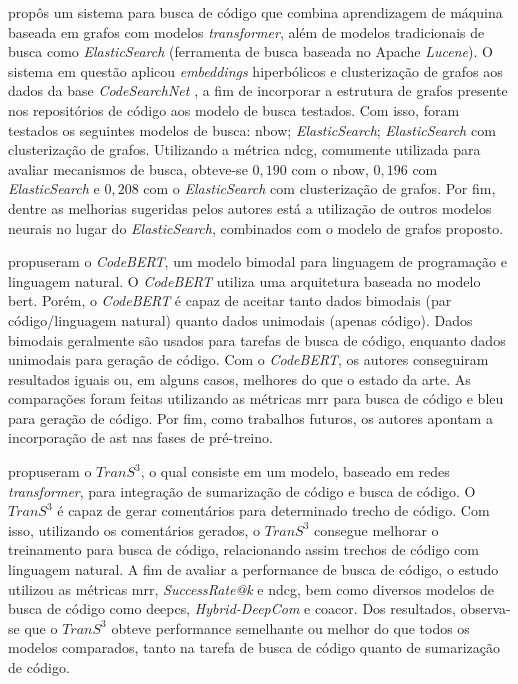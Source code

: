 \textcite{Chu2019AGA} propôs um sistema para busca de código que combina aprendizagem de máquina baseada em grafos com modelos \emph{transformer}, além de modelos tradicionais de busca como \textit{ElasticSearch} (ferramenta de busca baseada no Apache \textit{Lucene}). O sistema em questão aplicou \emph{embeddings} hiperbólicos e clusterização de grafos aos dados da base \emph{CodeSearchNet} \cite{Husain2019CodeSearchNetCE}, a fim de incorporar a estrutura de grafos presente nos repositórios de código aos modelo de busca testados. Com isso, foram testados os seguintes modelos de busca: \gls{nbow}; \textit{ElasticSearch}; \textit{ElasticSearch} com clusterização de grafos. Utilizando a métrica \gls{ndcg}, comumente utilizada para avaliar mecanismos de busca, obteve-se $0,190$ com o \gls{nbow}, $0,196$ com \textit{ElasticSearch} e $0,208$ com o \textit{ElasticSearch} com clusterização de grafos. Por fim, dentre as melhorias sugeridas pelos autores está a utilização de outros modelos neurais no lugar do \textit{ElasticSearch}, combinados com o modelo de grafos proposto.

\textcite{Feng2020CodeBERTAP} propuseram o \textit{CodeBERT}, um modelo bimodal para linguagem de programação e linguagem natural. O \textit{CodeBERT} utiliza uma arquitetura baseada no modelo \gls{bert}. Porém, o \textit{CodeBERT} é capaz de aceitar tanto dados bimodais (par código/linguagem natural) quanto dados unimodais (apenas código). Dados bimodais geralmente são usados para tarefas de busca de código, enquanto dados unimodais para geração de código. Com o \textit{CodeBERT}, os autores conseguiram resultados iguais ou, em alguns casos, melhores do que o estado da arte. As comparações foram feitas utilizando as métricas \gls{mrr} para busca de código e \gls{bleu} para geração de código. Por fim, como trabalhos futuros, os autores apontam a incorporação de \gls{ast} nas fases de pré-treino.

\textcite{Wang2020TranS3AT} propuseram o $TranS^3$, o qual consiste em um modelo, baseado em redes \textit{transformer}, para integração de sumarização de código e busca de código. O $TranS^3$ é capaz de gerar comentários para determinado trecho de código. Com isso, utilizando os comentários gerados, o $TranS^3$ consegue melhorar o treinamento para busca de código, relacionando assim trechos de código com linguagem natural. A fim de avaliar a performance de busca de código, o estudo utilizou as métricas \gls{mrr}, \textit{SuccessRate@k} e \gls{ndcg}, bem como diversos modelos de busca de código como \gls{deepcs}, \textit{Hybrid-DeepCom} e \gls{coacor}. Dos resultados, observa-se que o $TranS^3$ obteve performance semelhante ou melhor do que todos os modelos comparados, tanto na tarefa de busca de código quanto de sumarização de código.

